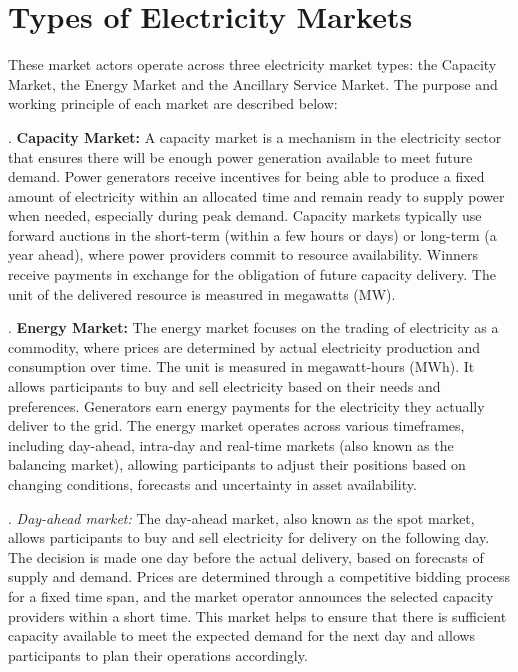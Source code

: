 \section{Types of Electricity Markets}
These market actors operate across three electricity market types: the Capacity Market, the Energy Market and the Ancillary Service Market. The purpose and working principle of each market are described below:

. \textbf{Capacity Market:} A capacity market is a mechanism in the electricity sector that ensures there will be enough power generation available to meet future demand. Power generators receive incentives for being able to produce a fixed amount of electricity within an allocated time and remain ready to supply power when needed, especially during peak demand. Capacity markets typically use forward auctions in the short-term (within a few hours or days) or long-term (a year ahead), where power providers commit to resource availability. Winners receive payments in exchange for the obligation of future capacity delivery. The unit of the delivered resource is measured in megawatts (MW).

. \textbf{Energy Market:} The energy market focuses on the trading of electricity as a commodity, where prices are determined by actual electricity production and consumption over time. The unit is measured in megawatt-hours (MWh). It allows participants to buy and sell electricity based on their needs and preferences. Generators earn energy payments for the electricity they actually deliver to the grid. The energy market operates across various timeframes, including day-ahead, intra-day and real-time markets (also known as the balancing market), allowing participants to adjust their positions based on changing conditions, forecasts and uncertainty in asset availability.

        . \textit{Day-ahead market:} The day-ahead market, also known as the spot market, allows participants to buy and sell electricity for delivery on the following day. The decision is made one day before the actual delivery, based on forecasts of supply and demand. Prices are determined through a competitive bidding process for a fixed time span, and the market operator announces the selected capacity providers within a short time. This market helps to ensure that there is sufficient capacity available to meet the expected demand for the next day and allows participants to plan their operations accordingly.

